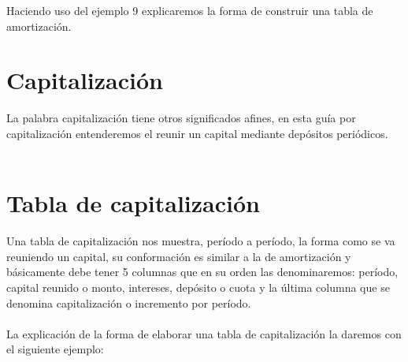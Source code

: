 	Haciendo uso del ejemplo 9 explicaremos la forma de construir una tabla de amortización.\\



   

	
        \section{Capitalización}
        La palabra capitalización tiene otros significados afines, en esta guía por capitalización entenderemos el reunir un capital mediante depósitos periódicos.
	\\\\
	\section{Tabla de capitalización}
	
	Una tabla de capitalización nos muestra, período a período, la forma como se va reuniendo un capital, su conformación es similar a la de amortización y básicamente debe tener 5 columnas que en su orden las denominaremos: período, capital reunido o monto, intereses, depósito o cuota y la última columna que se denomina capitalización o incremento por período.
	\\\\
	La explicación de la forma de elaborar una tabla de capitalización la daremos con el siguiente ejemplo:
	\\\\


   
	


\clearpage
